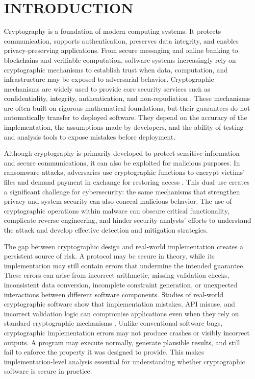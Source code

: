 \chapter{INTRODUCTION}
\label{ch:introduction}

Cryptography is a foundation of modern computing systems. It protects communication, supports authentication, preserves data integrity, and enables privacy-preserving applications. From secure messaging and online banking to blockchains and verifiable computation, software systems increasingly rely on cryptographic mechanisms to establish trust when data, computation, and infrastructure may be exposed to adversarial behavior. Cryptographic mechanisms are widely used to provide core security services such as confidentiality, integrity, authentication, and non-repudiation \cite{barker2016guideline}. These mechanisms are often built on rigorous mathematical foundations, but their guarantees do not automatically transfer to deployed software. They depend on the accuracy of the implementation, the assumptions made by developers, and the ability of testing and analysis tools to expose mistakes before deployment.

Although cryptography is primarily developed to protect sensitive information and secure communications, it can also be exploited for malicious purposes. In ransomware attacks, adversaries use cryptographic functions to encrypt victims' files and demand payment in exchange for restoring access \cite{beaman2021ransomware}. This dual use creates a significant challenge for cybersecurity: the same mechanisms that strengthen privacy and system security can also conceal malicious behavior. The use of cryptographic operations within malware can obscure critical functionality, complicate reverse engineering, and hinder security analysts' efforts to understand the attack and develop effective detection and mitigation strategies.

The gap between cryptographic design and real-world implementation creates a persistent source of risk. A protocol may be secure in theory, while its implementation may still contain errors that undermine the intended guarantee. These errors can arise from incorrect arithmetic, missing validation checks, inconsistent data conversion, incomplete constraint generation, or unexpected interactions between different software components. Studies of real-world cryptographic software show that implementation mistakes, API misuse, and incorrect validation logic can compromise applications even when they rely on standard cryptographic mechanisms \cite{georgiev2012most,lazar2014does}. Unlike conventional software bugs, cryptographic implementation errors may not produce crashes or visibly incorrect outputs. A program may execute normally, generate plausible results, and still fail to enforce the property it was designed to provide. This makes implementation-level analysis essential for understanding whether cryptographic software is secure in practice.

